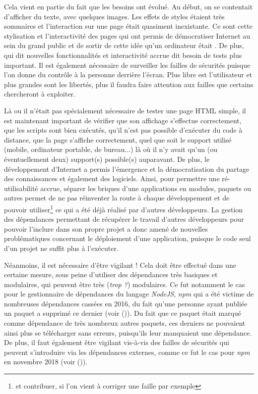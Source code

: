 Cela vient en partie du fait que les besoins ont évolué. Au début, on se contentait d'afficher du texte, avec quelques images. Les effets de styles étaient très sommaires et l'interaction sur une page était quasiment inexistante. Ce sont cette stylisation et l'interactivité des pages qui ont permis de démocratiser Internet au sein du grand public et de sortir de cette idée qu'un ordinateur était . De plus, qui dit nouvelles fonctionnalités et interactivité accrue dit besoin de tests plus important. Il est également nécessaire de surveiller les failles de sécurités puisque l'on donne du contrôle à la personne derrière l'écran. Plus libre est l'utilisateur et plus grandes sont les libertés, plus il faudra faire attention aux failles que certains chercheront à exploiter.

Là ou il n'était pas spécialement nécessaire de tester une page \gls{HTML} simple, il est maintenant important de vérifier que son affichage s'effectue correctement, que les scripts sont bien exécutés, qu'il n'est pas possible d'exécuter du code à distance, que la page s'affiche correctement, quel que soit le support utilisé (mobile, ordinateur portable, de bureau...) là où il n'y avait qu'un (ou éventuellement deux) support(s) possible(s) auparavant. De plus, le développement d'Internet a permis l'émergence et la démocratisation du partage des connaissances et également des logiciels. Ainsi, pour permettre une ré-utilisabilité accrue, séparer les briques d'une applications en modules, paquets ou autres permet de ne pas réinventer la route à chaque développement et de pouvoir utiliser\footnote{et contribuer, si l'on vient à corriger une faille par exemple} ce qui a été déjà réalisé par d'autres développeurs. La gestion des dépendances permettant de récupérer le travail d'autres développeurs pour pouvoir l'inclure dans son propre projet a donc amené de nouvelles problématiques concernant le déploiement d'une application, puisque le code seul d'un projet ne suffit plus à l'exécuter. 

Néanmoins, il est nécessaire d'être vigilant ! Cela doit être effectué dans une certaine mesure, sous peine d'utiliser des dépendances très basiques et modulaires, qui peuvent être très (\emph{trop ?}) modulaires. Ce fut notamment le cas pour le gestionnaire de dépendances du langage \emph{NodeJS}, \emph{npm} qui a été victime de nombreuses dépendances cassées en 2016, du fait qu'une personne ayant publiée un paquet a supprimé ce dernier (voir  \cite{npm-missing-deps} ()). Du fait que ce paquet était marqué comme dépendance de très nombreux autres paquets, ces derniers ne pouvaient ainsi plus se télécharger sans erreurs, puisqu'ils leur manquaient une dépendance. De plus, il faut également être vigilant vis-à-vis des failles de sécurités qui peuvent s'introduire via les dépendances externes, comme ce fut le cas pour \emph{npm} en novembre 2018 (voir  \cite{npm-faille} ()).

